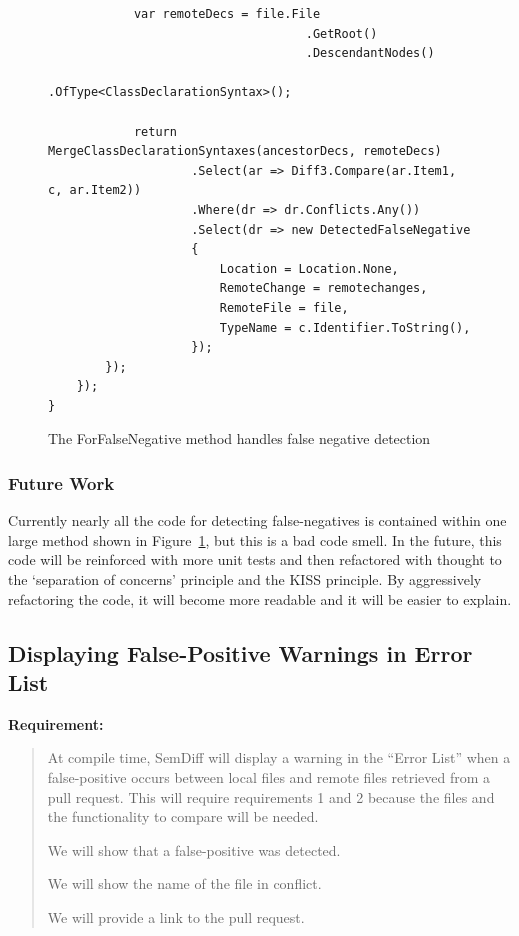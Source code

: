 \documentclass[draftclsnofoot,onecolumn]{IEEEtran}
\begin{document}
\begin{figure}[!t]
\begin{lstlisting}
            var remoteDecs = file.File
                                    .GetRoot()
                                    .DescendantNodes()
                                    .OfType<ClassDeclarationSyntax>();

            return MergeClassDeclarationSyntaxes(ancestorDecs, remoteDecs)
                    .Select(ar => Diff3.Compare(ar.Item1, c, ar.Item2))
                    .Where(dr => dr.Conflicts.Any())
                    .Select(dr => new DetectedFalseNegative
                    {
                        Location = Location.None,
                        RemoteChange = remotechanges,
                        RemoteFile = file,
                        TypeName = c.Identifier.ToString(),
                    });
        });
    });
}
\end{lstlisting}
\caption{The ForFalseNegative method handles false negative detection}
\label{anforfn}
\end{figure}

\subsubsection{Future Work}

Currently nearly all the code for detecting false-negatives is contained within 
one large method shown in Figure~\ref{anforfn}, but this is a bad code smell. 
In the future, this code will be reinforced with more unit tests and then 
refactored with thought to the ‘separation of concerns’ principle and the KISS 
principle. By aggressively refactoring the code, it will become more readable 
and it will be easier to explain.

\subsection{Displaying False-Positive Warnings in Error List}%

\textbf{Requirement:}

\begin{quote}

At compile time, SemDiff will display a warning in the “Error List” when a 
false-positive occurs between local files and remote files retrieved from a 
pull request. This will require requirements 1 and 2 because the files and the 
functionality to compare will be needed.

We will show that a false-positive was detected.

We will show the name of the file in conflict.

We will provide a link to the pull request.

\end{quote}
\end{document}
